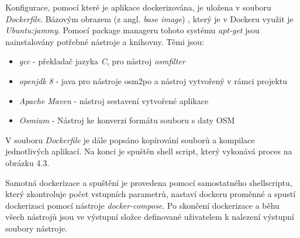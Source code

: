 Konfigurace, pomocí které je aplikace dockerizována, je uložena v souboru \textit{Dockerfile}. Bázovým obrazem (z angl. \textit{base image}) , který je v Dockeru využit je \textit{Ubuntu:jammy}. Pomocí package manageru tohoto systému \textit{apt-get} jsou nainstalovány potřebné nástroje a knihovny. Těmi jsou: 

\begin{itemize}
	\item \textit{gcc} - překladač jazyka \textit{C}, pro nástroj \textit{osmfilter}
	\item \textit{openjdk 8} - java pro nástroje osm2po a nástroj vytvořený v rámci projektu
	\item \textit{Apache Maven} - nástroj sestavení vytvořené aplikace
	\item \textit{Osmium} - Nástroj ke konverzi formátu souboru s daty OSM
\end{itemize}

V souboru \textit{Dockerfile} je dále popsáno kopírování souborů a kompilace jednotlivých aplikací. Na konci je spuštěn shell script, který vykonává proces na obrázku 4.3. 

Samotná dockerizace a spuštění je provedena pomocí samostatného shellscriptu, který zkontroluje počet vstupních parametrů, nastaví dockeru proměnné a spustí dockerizaci pomocí nástroje \textit{docker-compose}. Po skončení dockerizace a běhu všech nástrojů jsou ve výstupní složce definované uživatelem k nalezení výstupní soubory nástroje. 







